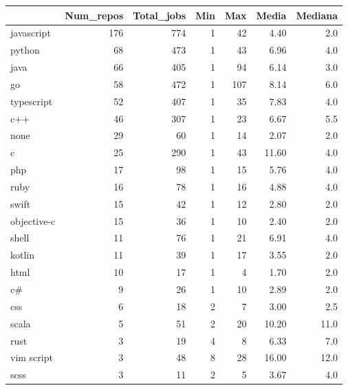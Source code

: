 \begin{tabular}{lrrrrrr}
\toprule
{} &  Num\_repos &  Total\_jobs &  Min &  Max &   Media &  Mediana \\
\midrule
javascript    &        176 &         774 &    1 &   42 &    4.40 &      2.0 \\
python        &         68 &         473 &    1 &   43 &    6.96 &      4.0 \\
java          &         66 &         405 &    1 &   94 &    6.14 &      3.0 \\
go            &         58 &         472 &    1 &  107 &    8.14 &      6.0 \\
typescript    &         52 &         407 &    1 &   35 &    7.83 &      4.0 \\
c++           &         46 &         307 &    1 &   23 &    6.67 &      5.5 \\
none          &         29 &          60 &    1 &   14 &    2.07 &      2.0 \\
c             &         25 &         290 &    1 &   43 &   11.60 &      4.0 \\
php           &         17 &          98 &    1 &   15 &    5.76 &      4.0 \\
ruby          &         16 &          78 &    1 &   16 &    4.88 &      4.0 \\
swift         &         15 &          42 &    1 &   12 &    2.80 &      2.0 \\
objective-c   &         15 &          36 &    1 &   10 &    2.40 &      2.0 \\
shell         &         11 &          76 &    1 &   21 &    6.91 &      4.0 \\
kotlin        &         11 &          39 &    1 &   17 &    3.55 &      2.0 \\
html          &         10 &          17 &    1 &    4 &    1.70 &      2.0 \\
c\#            &          9 &          26 &    1 &   10 &    2.89 &      2.0 \\
css           &          6 &          18 &    2 &    7 &    3.00 &      2.5 \\
scala         &          5 &          51 &    2 &   20 &   10.20 &     11.0 \\
rust          &          3 &          19 &    4 &    8 &    6.33 &      7.0 \\
vim script    &          3 &          48 &    8 &   28 &   16.00 &     12.0 \\
scss          &          3 &          11 &    2 &    5 &    3.67 &      4.0 \\

\end{tabular}
